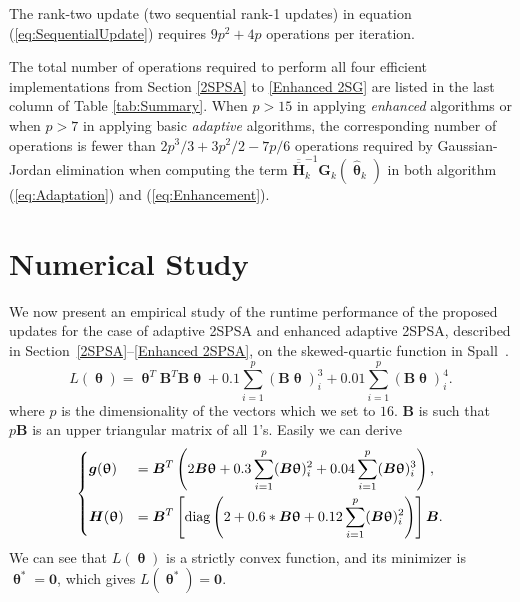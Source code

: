 \documentclass[conference]{IEEEtran}
\newcommand{\bG}{\bm{G}}
\newcommand{\ooH}{\bm{\overline{\overline{H}}}}
\newcommand{\htheta}{\bm{\hat{\uptheta}}}
\begin{document}
The rank-two update (two sequential rank-1 updates) in
equation (\ref{eq:SequentialUpdate}) requires $9p^2 + 4p$ operations
per iteration.

The total number of operations required to perform all four
efficient implementations from Section \ref{2SPSA} to \ref{Enhanced
  2SG} are listed in the last column of Table \ref{tab:Summary}. When
$p>15$ in applying \textit{enhanced} algorithms or when $p>7$ in
applying basic \textit{adaptive} algorithms, the corresponding number
of operations is fewer than $2p^3/3+3p^2/2-7p/6$ operations required
by Gaussian-Jordan elimination when computing the term $\ooH_k^{-1}
\bG_k(\htheta_k)$ in both algorithm (\ref{eq:Adaptation}) and
(\ref{eq:Enhancement}).


\section{Numerical Study}
We now present an empirical study of the runtime performance of the
proposed updates for the case of adaptive 2SPSA and enhanced adaptive
2SPSA, described in Section~\ref{2SPSA}--\ref{Enhanced 2SPSA}, on the
skewed-quartic function in Spall~\cite{Spall2009}.
\begin{equation*}
  L(\bm{\uptheta})=\bm{\uptheta}^{T}\bm{B}^{T}\bm{B}\bm{\uptheta}+0.1
  \sum_{i=1}^{p} (\bm{B}\bm{\uptheta})_i^3 +0.01 \sum_{i=1}^{p}
  (\bm{B}\bm{\uptheta})_i^4.
\end{equation*}
where $p$ is the dimensionality of the vectors which we set to $16$.
$\bm{B}$ is such that $p\bm{B}$ is an
upper triangular matrix of all 1's.
Easily we can derive
\begin{equation}
  \begin{dcases} \bm{g}(\bm{\uptheta})&=\bm{B}^{T}\left(
      2\bm{B}\bm{\uptheta}+0.3 \sum_{i=1}^{p}(\bm{B}\bm{\uptheta})_i^2 +0.04\sum_{i=1}^{p}(\bm{B}\bm{\uptheta})_i^3\right),\\
    \bm{H}(\bm{\uptheta})&=\bm{B}^{T}\left[\text{diag}\left(2+0.6*\bm{B}\bm{\uptheta}+0.12\sum_{i=1}^{p}(\bm{B}\bm{\uptheta})_i^2\right)\right]\bm{B}.\\
  \end{dcases}
\end{equation}
We can see that $L(\bm{\uptheta})$ is a
strictly convex function, and its minimizer is
$\bm{\uptheta}^{*}=\bm{0}$, which gives $L(\bm{\uptheta}^{*})=\bm{0}$.
\end{document}
